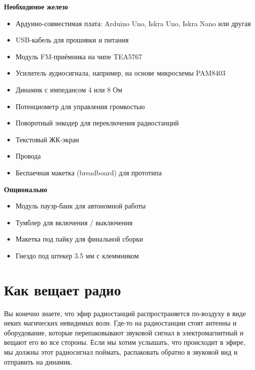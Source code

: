 \begin{adjustwidth*}{-2.26cm}{}
    \begin{minipage}[t]{13.28cm}
      \textbf{Необходимое железо}
      \begin{multicols}{2}
        \begin{itemize}[label={},leftmargin=*]
          \item Ардуино-совместимая плата: Arduino Uno, Iskra Uno, Iskra Nano или другая
          \item USB-кабель для прошивки и питания
          \item Модуль FM-приёмника на чипе TEA5767
          \item Усилитель аудиосигнала, например, на основе микросхемы PAM8403
          \item Динамик с импедансом 4 или 8 Ом
          \item Потенциометр для управления громкостью
          \item Поворотный энкодер для переключения радиостанций
          \item Текстовый ЖК-экран
          \item Провода
          \item Беспаечная макетка (breadboard) для прототипа
        \end{itemize}
      \end{multicols}

      \textbf{Опционально}
      \begin{multicols}{2}
        \begin{itemize}[label={},leftmargin=*]
          \item Модуль пауэр-банк для автономной работы
          \item Тумблер для включения / выключения
          \item Макетка под пайку для финальной сборки
          \item Гнездо под штекер 3.5 мм с клеммником
        \end{itemize}
      \end{multicols}
    \end{minipage}
\end{adjustwidth*}

\section{Как вещает радио}

Вы конечно знаете, что эфир радиостанций распространяется по-воздуху в виде неких магических невидимых волн. Где-то на радиостанции стоят антенны и оборудование, которые перепаковывают звуковой сигнал в электромагнитный и вещают его во все стороны. Если мы хотим услышать, что происходит в эфире, мы должны этот радиосигнал поймать, распаковать обратно в звуковой вид и отправить на динамик.


